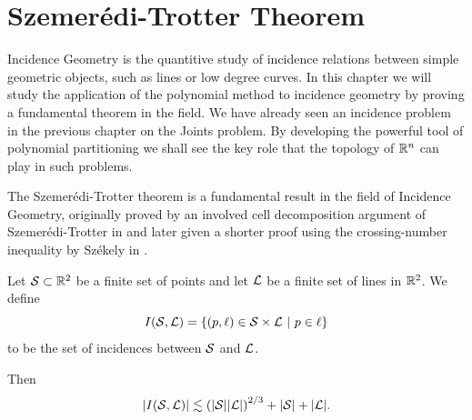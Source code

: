 \chapter{Szemerédi-Trotter Theorem \label{chap:trotter}}


Incidence Geometry is the quantitive study of incidence relations between simple geometric objects, such as lines or low degree curves. 
In this chapter we will study the application of the polynomial method to incidence geometry by proving a fundamental theorem in the field.
We have already seen an incidence problem in the previous chapter on the Joints problem. 
By developing the powerful tool of polynomial partitioning we shall see the key role that the topology of $\mathbb R^n$ can play in such problems.


The Szemerédi-Trotter theorem is a fundamental result in the field of Incidence Geometry, originally proved by an involved cell decomposition argument
of Szemerédi-Trotter in \cite{szemeredi1983extremal} and later given a shorter proof using the crossing-number inequality by Székely in \cite{szekely1997crossing}. 
\begin{theorem}     \label{thm:S-T}
    Let $\mathcal S \subset\mathbb R^2$ be a finite set of points and
    let $\mathcal L$ be a finite set of lines in $\mathbb R^2$. We define 
    \[I(\ES,\LL) = \{(p, \ell) \in \ES \times \LL \ | \ p \in \ell\}\] 
    to be the set of incidences between $\mathcal S$ and $\mathcal L$. 
   
    Then
    \[
        |I(\mathcal S, \mathcal L)| \lesssim \left(|\mathcal S||\mathcal L|\right)^{2/3} + |\mathcal S| + |\mathcal L|.
    \]
\end{theorem}


